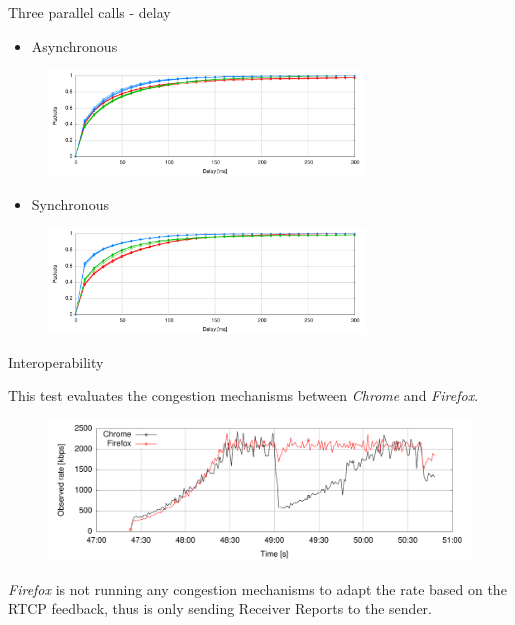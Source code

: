 \documentclass[first=red,second=purple,logo=yellowexc]{aaltoslides}
\begin{document}
\begin{frame}{Three parallel calls - delay}

\begin{itemize}
\item Asynchronous
\end{itemize}
\begin{figure}[h]
  \centering
  \includegraphics[width=0.75\textwidth]{async_total_delay_distribution.pdf}
\end{figure}
\begin{itemize}
\item Synchronous
\end{itemize}
\begin{figure}[h]
  \centering
  \includegraphics[width=0.75\textwidth]{three_parallel_total_delay_distribution.pdf}
\end{figure}
\end{frame}


\begin{frame}{Interoperability}

This test evaluates the congestion mechanisms between {\it Chrome} and {\it Firefox}. 
\begin{figure}[h]
  \centering
  \includegraphics[width=1\textwidth]{firefoxvschrome1.pdf}
\end{figure}
{\it Firefox} is not running any congestion mechanisms to adapt the rate based on the RTCP feedback, thus is only sending Receiver Reports to the sender.
\end{frame}
\end{document}
